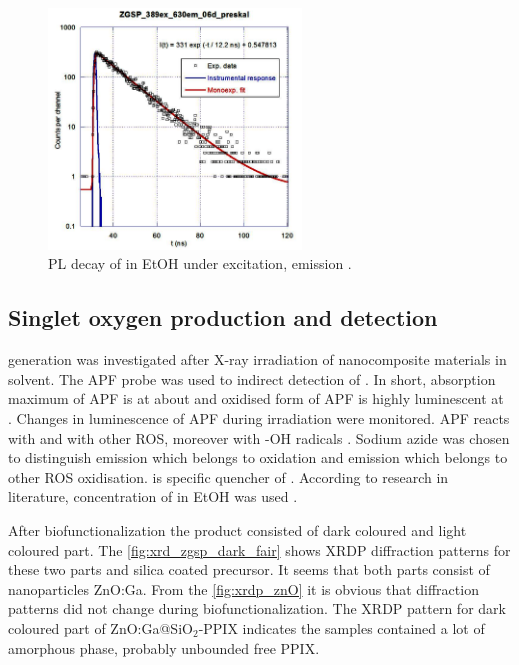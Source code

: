     \begin{figure}
        \centering
        \includegraphics[width=0.6\textwidth]{pictures/zgsp_januar_389ex_630em.PNG}
        \caption{PL decay of {\znoo} in EtOH under  excitation, emission .}
        \label{fig:zgsp_januar_389ex_630em}
    \end{figure}
    
    \subsection{Singlet oxygen production and detection}
    
    {\singlet} generation was investigated after X-ray irradiation of nanocomposite materials in solvent. The APF probe was used to indirect detection of {\singlet}. In short, absorption maximum of APF is at about  and oxidised form of APF is highly luminescent at . Changes in luminescence of APF during irradiation were monitored. APF reacts with {\singlet} and with other ROS, moreover with -OH radicals \cite{bartosz06, setsukinai03}. Sodium azide {\azid} was chosen to distinguish emission which belongs to {\singlet} oxidation and emission which belongs to other ROS oxidisation. {\azid} is specific quencher of {\singlet} \cite{bulin13}. According to research in literature, concentration  of {\azid} in EtOH was used \cite{price09,bancirova11, huang12, liyi12}.
    
    After biofunctionalization the product consisted of dark coloured and light coloured part. The \cref{fig:xrd_zgsp_dark_fair} shows XRDP diffraction patterns for these two parts and silica coated precursor. It seems that both parts consist of nanoparticles ZnO:Ga. From the \cref{fig:xrdp_znO} it is obvious that diffraction patterns did not change during biofunctionalization. The XRDP pattern for dark coloured part of ZnO:Ga@SiO$_{2}$-PPIX indicates the samples contained a lot of amorphous phase, probably unbounded free PPIX.


